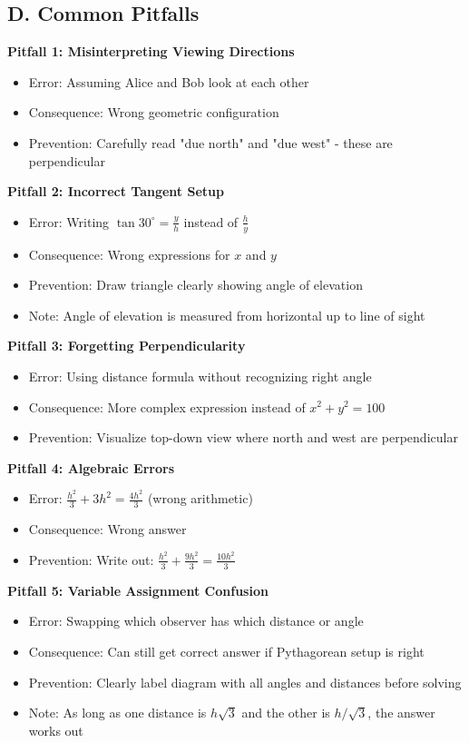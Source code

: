 \documentclass[12pt]{article}
\begin{document}
\begin{roadmapbox}
\subsection*{D. Common Pitfalls}

\textbf{Pitfall 1: Misinterpreting Viewing Directions}
\begin{itemize}[leftmargin=*]
    \item Error: Assuming Alice and Bob look at each other
    \item Consequence: Wrong geometric configuration
    \item Prevention: Carefully read "due north" and "due west" - these are perpendicular
\end{itemize}

\textbf{Pitfall 2: Incorrect Tangent Setup}
\begin{itemize}[leftmargin=*]
    \item Error: Writing $\tan 30^\circ = \frac{y}{h}$ instead of $\frac{h}{y}$
    \item Consequence: Wrong expressions for $x$ and $y$
    \item Prevention: Draw triangle clearly showing angle of elevation
    \item Note: Angle of elevation is measured from horizontal up to line of sight
\end{itemize}

\textbf{Pitfall 3: Forgetting Perpendicularity}
\begin{itemize}[leftmargin=*]
    \item Error: Using distance formula without recognizing right angle
    \item Consequence: More complex expression instead of $x^2 + y^2 = 100$
    \item Prevention: Visualize top-down view where north and west are perpendicular
\end{itemize}

\textbf{Pitfall 4: Algebraic Errors}
\begin{itemize}[leftmargin=*]
    \item Error: $\frac{h^2}{3} + 3h^2 = \frac{4h^2}{3}$ (wrong arithmetic)
    \item Consequence: Wrong answer
    \item Prevention: Write out: $\frac{h^2}{3} + \frac{9h^2}{3} = \frac{10h^2}{3}$
\end{itemize}

\textbf{Pitfall 5: Variable Assignment Confusion}
\begin{itemize}[leftmargin=*]
    \item Error: Swapping which observer has which distance or angle
    \item Consequence: Can still get correct answer if Pythagorean setup is right
    \item Prevention: Clearly label diagram with all angles and distances before solving
    \item Note: As long as one distance is $h\sqrt{3}$ and the other is $h/\sqrt{3}$, the answer works out
\end{itemize}


\end{roadmapbox}
\end{document}
